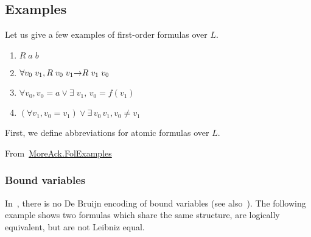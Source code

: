 \subsection{Examples}




Let us give a few examples of first-order formulas over $L$.
\label{fol:examplesf1f2f3}
\begin{enumerate}
\item $R\;a\;b$
\item $\forall v_0\; v_1, R\;v_0\;v_1 \mbox{$\rightarrow$} R\;v_1\;v_0$
\item $ \forall v_0, v_0=a \vee \exists\;v_1,\, v_0= f(v_1)$
\item $(\forall v_1, v_0 = v_1) \vee \exists\,v_0\,v_1, v_0 \not= v_1$
\end{enumerate}

First, we define abbreviations for atomic formulas over $L$.

\noindent From~\href{../theories/html/hydras.MoreAck.FolExamples.html}{MoreAck.FolExamples}


\label{sec:fol-atomic-notations}
\label{sect:folFormExamples}














\subsubsection{Bound variables}

  In~\cite{Goedel}, there is no De Bruijn encoding of bound variables (see also~\cite{OConnor05}). The following example shows two formulas which share the same structure, are logically equivalent, but are not Leibniz equal.



\vspace{4pt}

